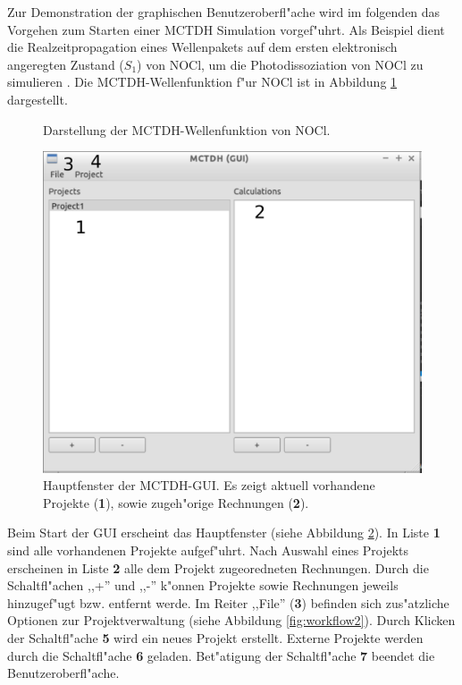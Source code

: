 Zur Demonstration der graphischen Benutzeroberfl"ache wird im folgenden das Vorgehen zum Starten einer 
MCTDH Simulation vorgef"uhrt. Als Beispiel dient die Realzeitpro\-pagation eines Wellenpakets auf dem
ersten elektronisch angeregten Zustand ($S_1$) von NOCl, um die Photodissoziation von NOCl zu simulieren \cite{MMC1}.  
Die MCTDH-Wellenfunktion f"ur NOCl ist in Abbildung \ref{fig:NOCl} dargestellt. 

\begin{figure}
    \centering
    \caption{Darstellung der MCTDH-Wellenfunktion von NOCl.}\label{fig:NOCl}
\end{figure}

\begin{figure}
    \centering
    \includegraphics[scale=0.5]{figures/screenMain}
    \caption{Hauptfenster der MCTDH-GUI. Es zeigt aktuell vorhandene Projekte (\textbf{1}), sowie zugeh"orige Rechnungen (\textbf{2}).}\label{fig:workflow1}
\end{figure}

Beim Start der GUI erscheint das Hauptfenster (siehe Abbildung \ref{fig:workflow1}).
In Liste \textbf{1} sind alle vorhandenen Projekte aufgef"uhrt.
Nach Auswahl eines Projekts erscheinen in Liste \textbf{2} alle dem Projekt zugeoredneten Rechnungen.
Durch die Schaltfl"achen ,,+'' und ,,-'' k"onnen Projekte sowie Rechnungen jeweils hinzugef"ugt bzw.
entfernt werde.
Im Reiter ,,File'' (\textbf{3}) befinden sich zus"atzliche Optionen zur Projektverwaltung (siehe Abbildung \ref{fig:workflow2}).
Durch Klicken der Schaltfl"ache \textbf{5} wird ein neues Projekt erstellt. Externe Projekte werden durch die 
Schaltfl"ache \textbf{6} geladen. Bet"atigung der Schaltfl"ache \textbf{7} beendet die Benutzeroberfl"ache.


